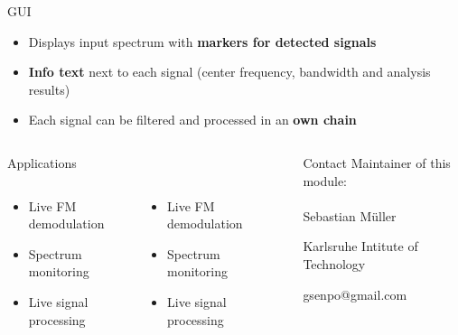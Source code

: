 \documentclass{beamer}
\begin{document}
\begin{frame}
\begin{columns}[t]
\begin{column}{0.66\textwidth}
\begin{block}{GUI}
\begin{figure}
      \end{figure}
      \begin{itemize}
        \item Displays input spectrum with \textbf{markers for detected signals}
        \item \textbf{Info text} next to each signal (center frequency, bandwidth and analysis results)
        \item Each signal can be filtered and processed in an \textbf{own chain}
      \end{itemize}
      \end{block}
    \end{column}
  \end{columns}
  \begin{columns}[t]
  	\begin{column}{0.66\textwidth}
  		\begin{block}{Applications}
  			\begin{columns}
        \begin{column}{0.45\textwidth}
        \begin{itemize}
          \item Live FM demodulation
          \item Spectrum monitoring
          \item Live signal processing
        \end{itemize}
        \end{column}
        \begin{column}{0.45\textwidth}
         \begin{itemize}
          \item Live FM demodulation
          \item Spectrum monitoring
          \item Live signal processing
        \end{itemize}
        \end{column}
        \end{columns}
  		\end{block}
  	\end{column}
  	\begin{column}{0.01\textwidth}
  	\end{column}
  	\begin{column}{0.33\textwidth}
  		\begin{block}{Contact}
  			Maintainer of this module:\\~\\
  			Sebastian Müller

  			Karlsruhe Intitute of Technology

  			gsenpo@gmail.com
  		\end{block}
  	\end{column}
  \end{columns}
\end{frame}
\end{document}
